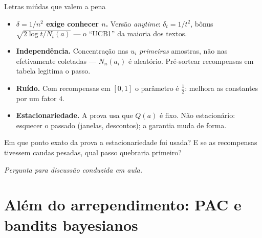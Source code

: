 \documentclass[aspectratio=169, 11pt]{beamer}
\newcommand{\paradiscussao}{\smallskip
  {\footnotesize\color{rlCinza}\itshape Pergunta para discussão conduzida em aula.}}
\begin{document}
\begin{frame}{Letras miúdas que valem a pena}
  {\footnotesize
  \begin{itemize}\setlength{\itemsep}{0.4ex}
    \item \textbf{$\delta = 1/n^{2}$ exige conhecer $n$.} Versão \emph{anytime}:
          $\delta_t = 1/t^{2}$, bônus $\sqrt{2\log t/N_t(a)}$ --- o ``UCB1''
          da maioria dos textos.
    \item \textbf{Independência.} Concentração nas $u_i$ \emph{primeiras}
          amostras, não nas efetivamente coletadas --- $N_n(a_i)$ é
          aleatório. Pré-sortear recompensas em tabela legitima o passo.
    \item \textbf{Ruído.} Com recompensas em $[0,1]$ o parâmetro é $\tfrac12$:
          melhora as constantes por um fator $4$.
    \item \textbf{Estacionariedade.} A prova usa que $Q(a)$ é fixo. Não
          estacionário: esquecer o passado (janelas, descontos); a garantia
          muda de forma.
  \end{itemize}}

  \begin{quizbox}{}
    Em que ponto exato da prova a estacionariedade foi usada? E se as
    recompensas tivessem caudas pesadas, qual passo quebraria primeiro?
  \end{quizbox}
  \paradiscussao
\end{frame}

\section{Além do arrependimento: PAC e bandits bayesianos}
\end{document}
